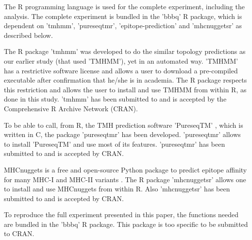 The R programming language is used for the complete 
experiment, including the analysis.
The complete experiment is bundled in the 'bbbq' R package,
which is dependent on 'tmhmm', 'pureseqtmr', 
'epitope-prediction' and 'mhcnuggetsr'
as described below.


The R package 'tmhmm' was developed to do the similar topology
predictions as our earlier study (that used 'TMHMM'), yet in an automated way.
'TMHMM' has a restrictive software license \cite{krogh2001predicting} 
and allows a user
to download a pre-compiled executable after confirmation that he/she
is in academia. The R package respects this restriction
and allows the user to install and use TMHMM from within R,
as done in this study.
'tmhmm' has been submitted to and is accepted 
by the Comprehensive R Archive Network (CRAN).


To be able to call, from R, the TMH prediction 
software 'PureseqTM' \cite{wang2019efficient},
which is written in C, the package 'pureseqtmr' has been developed. 
'pureseqtmr' allows to install 'PureseqTM' and use most of its features.
'pureseqtmr' has been submitted to and is accepted by CRAN.


MHCnuggets is a free and open-source Python package to predict 
epitope affinity for many MHC-I and MHC-II variants \cite{shao2020high}.
The R package 'mhcnuggetsr' allows one to install and use MHCnuggets
from within R.
Also 'mhcnuggetsr' has been submitted to and is accepted by CRAN.


To reproduce the full experiment presented in this paper,
the functions needed are bundled in the 'bbbq' R package.
This package is too specific to be submitted to CRAN.

